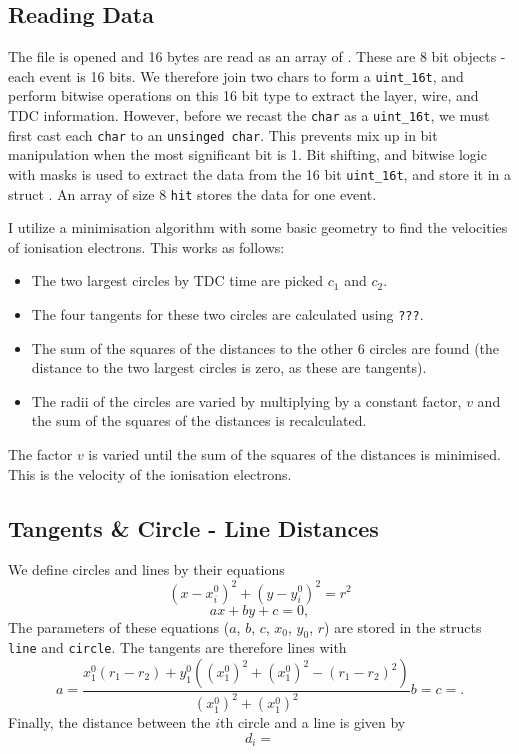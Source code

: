 \documentclass[11pt]{article}
\begin{document}
\subsection{Reading Data}
\label{sec:reading}
The file is opened and 16 bytes are read as an array of . These are 8 bit objects - each event is 16 bits. We therefore join two chars to form a \texttt{uint\_16t}, and perform bitwise operations on this 16 bit type to extract the layer, wire, and TDC information. However, before we recast the \texttt{char} as a \texttt{uint\_16t}, we must first cast each \texttt{char} to an \texttt{unsinged char}. This prevents mix up in bit manipulation when the most significant bit is 1. Bit shifting, and bitwise logic with masks is used to extract the data from the 16 bit \texttt{uint\_16t}, and store it in a struct . An array of size 8 \texttt{hit} stores the data for one event.


I utilize a minimisation algorithm with some basic geometry to find the velocities of ionisation electrons. This works as follows:
\begin{itemize}
    \item The two largest circles by TDC time are picked $c_1$ and $c_2$.
    \item The four tangents for these two circles are calculated using \texttt{???}.
    \item The sum of the squares of the distances to the other 6 circles are found (the distance to the two largest circles is zero, as these are tangents).
    \item The radii of the circles are varied by multiplying by a constant factor, $v$ and the sum of the squares of the distances is recalculated.
\end{itemize}
The factor $v$ is varied until the sum of the squares of the distances is minimised. This is the velocity of the ionisation electrons.

\subsection{Tangents \& Circle - Line Distances}
\label{sec:tangents}
We define circles and lines by their equations
\begin{equation}
    (x - x^0_i)^2 + (y - y^0_i)^2 = r^2
    \label{eq:circle}
\end{equation}
\begin{equation}
    ax + by + c = 0,
    \label{eq:line}
\end{equation}
The parameters of these equations ($a$, $b$, $c$, $x_0$, $y_0$, $r$) are stored in the structs \texttt{line} and \texttt{circle}. The tangents are therefore lines with
\begin{equation}
    a = \frac{x^0_1(r_1-r_2) + y^0_1((x^0_1)^2 + (x^0_1)^2-(r_1 - r_2)^2)}{(x^0_1)^2 + (x^0_1)^2}
    b = 
    c = .
    \label{eq:tange/nts}
\end{equation}
Finally, the distance between the $i$th circle and a line is given by
\begin{equation}
    d_i = 
    \label{eq:dist}
\end{equation}
\end{document}
